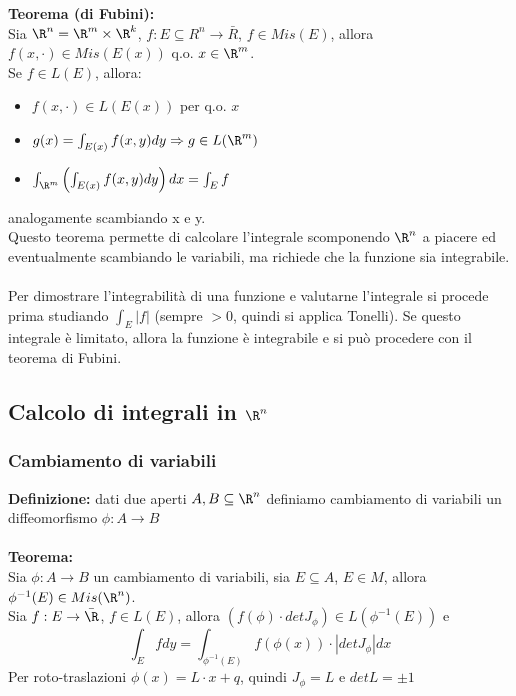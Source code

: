 \documentclass{article}
\begin{document}
\textbf{Teorema (di Fubini):}\\
Sia $\R^n=\R^m\times\R^k$, $f:E\subseteq R^n\rightarrow\bar{R}$, $f\in Mis(E)$, allora $f(x,\cdot)\in Mis(E(x))$ q.o. $x\in\R^m$.\\
Se $f\in L(E)$, allora:
\begin{itemize}
    \item $f(x,\cdot)\in L(E(x))$ per q.o. $x$
    \item $g(x)=\int_{E(x)}f(x,y)dy\Rightarrow g\in L(\R^m)$
    \item $\int_{\R^m}\left( \int_{E(x)}f(x,y)dy \right)dx=\int_Ef$
\end{itemize}
analogamente scambiando x e y.\\
Questo teorema permette di calcolare l'integrale scomponendo $\R^n$ a piacere ed eventualmente scambiando le variabili, ma richiede che la funzione sia integrabile.\\\\
Per dimostrare l'integrabilità di una funzione e valutarne l'integrale si procede prima studiando $\int_E|f|$ (sempre $>0$, quindi si applica Tonelli). Se questo integrale è limitato, allora la funzione è integrabile e si può procedere con il teorema di Fubini.

\subsection{Calcolo di integrali in $\R^n$}
\subsubsection{Cambiamento di variabili}
\textbf{Definizione:} dati due aperti $A,B\subseteq\R^n$ definiamo cambiamento di variabili un diffeomorfismo $\phi:A\rightarrow B$\\\\
\textbf{Teorema:}\\
Sia $\phi:A\rightarrow B$ un cambiamento di variabili, sia $E\subseteq A$, $E\in M$, allora $\phi^{-1}(E)\in Mis(\R^n)$.\\
Sia $f:E\rightarrow\bar{\R}$, $f\in L(E)$, allora $(f(\phi)\cdot detJ_\phi)\in L(\phi^{-1}(E))$ e
$$ \int_E fdy=\int_{\phi^{-1}(E)}f(\phi(x))\cdot|detJ_\phi|dx $$
Per roto-traslazioni $\phi(x)=L\cdot x+q$, quindi $J_\phi=L$ e $det L=\pm 1$
\end{document}
